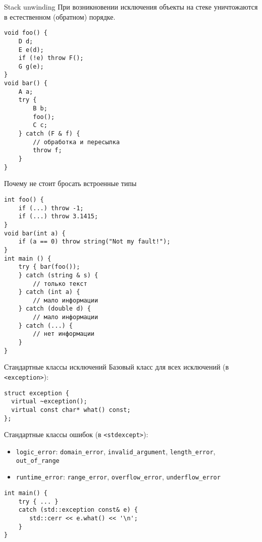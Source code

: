 \documentclass[aspectration=1610,t]{beamer}
\begin{document}
\begin{frame}[fragile]{Stack unwinding}
При возникновении исключения объекты на стеке
уничтожаются\\ в естественном (обратном) порядке.
\begin{lstlisting}
void foo() {
    D d;
    E e(d);
    if (!e) throw F();
    G g(e);
}
void bar() {
    A a;
    try {
        B b;
        foo();
        C c;
    } catch (F & f) {
        // обработка и пересылка
        throw f;
    }
}
\end{lstlisting}
\end{frame}

\begin{frame}[fragile]{Почему не стоит бросать встроенные типы}
\begin{lstlisting}
int foo() {
    if (...) throw -1;
    if (...) throw 3.1415;
}
void bar(int a) {
    if (a == 0) throw string("Not my fault!");
}
int main () {
    try { bar(foo());
    } catch (string & s) {
        // только текст
    } catch (int a) { 
        // мало информации
    } catch (double d) { 
        // мало информации
    } catch (...) { 
        // нет информации 
    }
}
\end{lstlisting}
\end{frame}

\begin{frame}[fragile]{Стандартные классы исключений}
    Базовый класс для всех исключений (в {\tt <exception>}):
    \begin{lstlisting}
struct exception {
  virtual ~exception();
  virtual const char* what() const;
}; 
    \end{lstlisting}

    Стандартные классы ошибок (в {\tt <stdexcept>}):\\
    \begin{itemize}
        \item {\tt logic\_error}: 
     {\tt domain\_error}, {\tt invalid\_argument}, {\tt length\_error}, {\tt
     out\_of\_range}\\
        \item {\tt runtime\_error}: 
        {\tt range\_error},
        {\tt overflow\_error}, 
        {\tt underflow\_error}
    \end{itemize}

\begin{lstlisting}
int main() {
    try { ... }
    catch (std::exception const& e) {
       std::cerr << e.what() << '\n';
    }
}
\end{lstlisting}
\end{frame}
 
\end{document}

